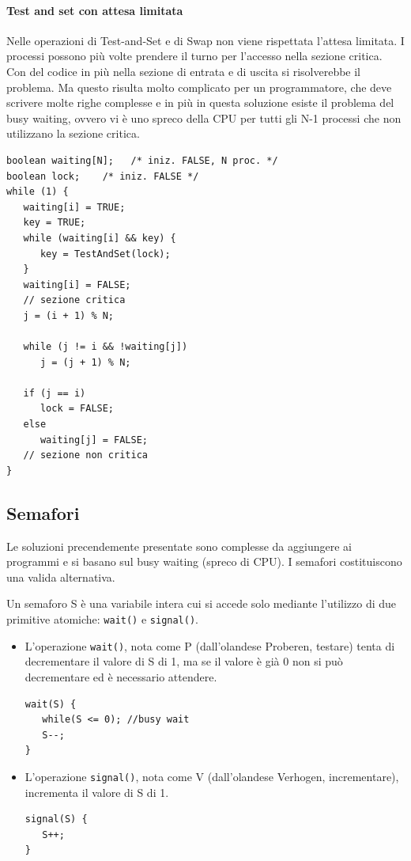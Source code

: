 \documentclass[a4paper]{article}
\begin{document}
\paragraph{Test and set con attesa limitata}
Nelle operazioni di Test-and-Set e di Swap non viene rispettata l’attesa limitata. I processi possono più volte prendere il turno per l’accesso nella sezione critica. Con del codice in più nella sezione di entrata e di uscita si risolverebbe il problema. Ma questo risulta molto complicato per un programmatore, che deve scrivere molte righe complesse e in più in questa soluzione esiste il problema del busy waiting, ovvero vi è uno spreco della CPU per tutti gli N-1 processi che non utilizzano la sezione critica.
\begin{verbatim}
boolean waiting[N];   /* iniz. FALSE, N proc. */
boolean lock;    /* iniz. FALSE */
while (1) {
   waiting[i] = TRUE;
   key = TRUE;
   while (waiting[i] && key) {
      key = TestAndSet(lock);
   }
   waiting[i] = FALSE;
   // sezione critica
   j = (i + 1) % N;
   
   while (j != i && !waiting[j])
      j = (j + 1) % N;
   
   if (j == i) 
      lock = FALSE;
   else
      waiting[j] = FALSE;
   // sezione non critica
}
\end{verbatim}

\subsection{Semafori}
Le soluzioni precendemente presentate sono complesse da aggiungere ai programmi e si basano sul busy waiting (spreco di CPU). I semafori costituiscono una valida alternativa.

Un semaforo S è una variabile intera cui si accede solo mediante l'utilizzo di due primitive atomiche: \texttt{wait()} e \texttt{signal()}.
\begin{itemize}
    \item L'operazione \texttt{wait()}, nota come P (dall'olandese Proberen, testare) tenta di decrementare il valore di S di 1, ma se il valore è già 0 non si può decrementare ed è necessario attendere.
          \begin{verbatim}
wait(S) {
   while(S <= 0); //busy wait
   S--;
}
\end{verbatim}
    \item L'operazione \texttt{signal()}, nota come V (dall'olandese Verhogen, incrementare), incrementa il valore di S di 1.
          \begin{verbatim}
signal(S) {
   S++;
}
\end{verbatim}
\end{itemize}
\end{document}
